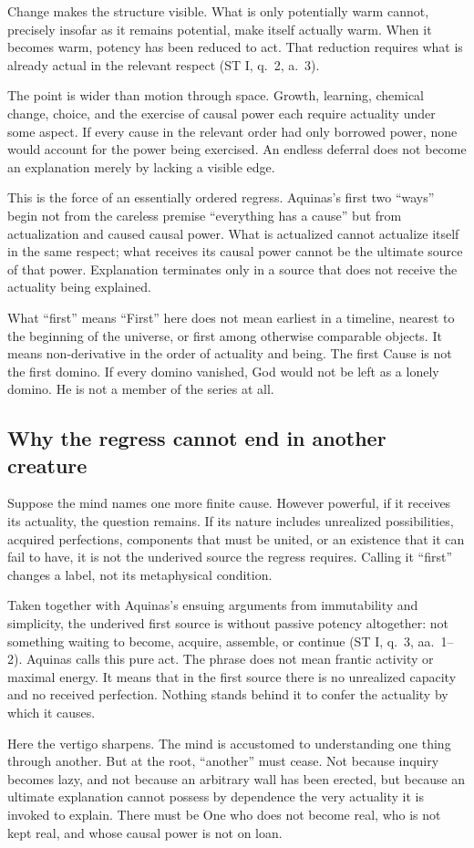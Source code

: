 Change makes the structure visible. What is only potentially warm cannot, precisely insofar as it remains potential, make itself actually warm. When it becomes warm, potency has been reduced to act. That reduction requires what is already actual in the relevant respect (ST I, q.~2, a.~3).

The point is wider than motion through space. Growth, learning, chemical change, choice, and the exercise of causal power each require actuality under some aspect. If every cause in the relevant order had only borrowed power, none would account for the power being exercised. An endless deferral does not become an explanation merely by lacking a visible edge.

This is the force of an essentially ordered regress. Aquinas's first two ``ways'' begin not from the careless premise ``everything has a cause'' but from actualization and caused causal power. What is actualized cannot actualize itself in the same respect; what receives its causal power cannot be the ultimate source of that power. Explanation terminates only in a source that does not receive the actuality being explained.

\begin{studybox}{What ``first'' means}
``First'' here does not mean earliest in a timeline, nearest to the beginning of the universe, or first among otherwise comparable objects. It means non-derivative in the order of actuality and being. The first Cause is not the first domino. If every domino vanished, God would not be left as a lonely domino. He is not a member of the series at all.
\end{studybox}

\subsection{Why the regress cannot end in another creature}

Suppose the mind names one more finite cause. However powerful, if it receives its actuality, the question remains. If its nature includes unrealized possibilities, acquired perfections, components that must be united, or an existence that it can fail to have, it is not the underived source the regress requires. Calling it ``first'' changes a label, not its metaphysical condition.

Taken together with Aquinas's ensuing arguments from immutability and simplicity, the underived first source is without passive potency altogether: not something waiting to become, acquire, assemble, or continue (ST I, q.~3, aa.~1--2). Aquinas calls this pure act. The phrase does not mean frantic activity or maximal energy. It means that in the first source there is no unrealized capacity and no received perfection. Nothing stands behind it to confer the actuality by which it causes.

Here the vertigo sharpens. The mind is accustomed to understanding one thing through another. But at the root, ``another'' must cease. Not because inquiry becomes lazy, and not because an arbitrary wall has been erected, but because an ultimate explanation cannot possess by dependence the very actuality it is invoked to explain. There must be One who does not become real, who is not kept real, and whose causal power is not on loan.
